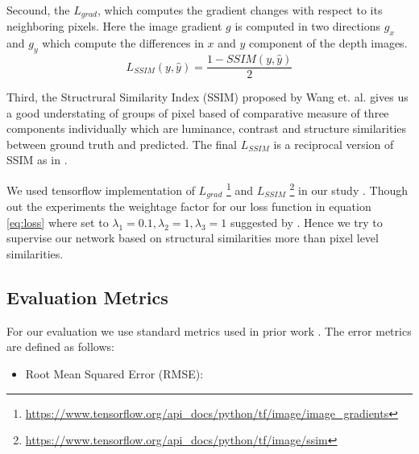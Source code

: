 Secound, the \(L_{grad}\), which computes the gradient changes with respect to its neighboring pixels. Here the image gradient \(g\) is computed in two directions \(g_{x}\) and \(g_{y}\) which compute the differences in \(x\) and \(y\) component of the depth images. \\


\begin{equation} \label{eq:loss_SSIM}
       L_{SSIM}(y, \hat{y}) = \frac{1- SSIM(y, \hat{y})}{2}
\end{equation}

Third, the Structrural Similarity Index (SSIM) proposed by Wang et. al. \cite{wang2004image} gives us a good understating of groups of pixel based of comparative measure of three components individually which are luminance, contrast and structure similarities between ground truth and predicted. The final \(L_{SSIM}\) is a reciprocal version of SSIM as in \cite{Alhashim2018,  ummenhofer2017demon, huang2018deepmvs}.




We used tensorflow implementation of \(L_{grad}\) \footnote{\url{https://www.tensorflow.org/api_docs/python/tf/image/image_gradients}} and \(L_{SSIM}\) \footnote{\url{https://www.tensorflow.org/api_docs/python/tf/image/ssim}}  in our study \cite{tensorflow2015-whitepaper}. Though out the experiments the weightage factor for our loss function in equation \ref{eq:loss} where set to  \(\lambda_{1} = 0.1, \lambda_{2} = 1, \lambda_{3} = 1\) suggested by \cite{Alhashim2018}. Hence we try to supervise our network based on structural similarities more than pixel level similarities. 






\subsection{Evaluation Metrics}
For our evaluation we use standard metrics used in prior work \cite{Alhashim2018, eigen2014depth}. The error metrics are defined as follows:
\begin{itemize}
    
    \item Root Mean Squared Error (RMSE):
    
\end{itemize}{}

